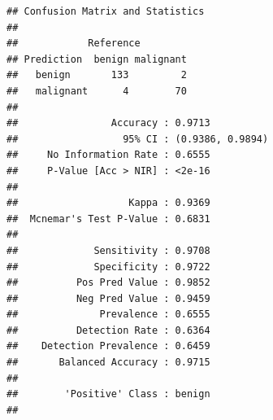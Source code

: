 \documentclass[]{article}
\newenvironment{Shaded}{\begin{snugshade}}{\end{snugshade}}
\newcommand{\KeywordTok}[1]{\textcolor[rgb]{0.13,0.29,0.53}{\textbf{{#1}}}}
\newcommand{\DataTypeTok}[1]{\textcolor[rgb]{0.13,0.29,0.53}{{#1}}}
\newcommand{\FloatTok}[1]{\textcolor[rgb]{0.00,0.00,0.81}{{#1}}}
\newcommand{\StringTok}[1]{\textcolor[rgb]{0.31,0.60,0.02}{{#1}}}
\newcommand{\OtherTok}[1]{\textcolor[rgb]{0.56,0.35,0.01}{{#1}}}
\newcommand{\NormalTok}[1]{{#1}}
\begin{document}
\begin{verbatim}
## Confusion Matrix and Statistics
## 
##            Reference
## Prediction  benign malignant
##   benign       133         2
##   malignant      4        70
##                                           
##                Accuracy : 0.9713          
##                  95% CI : (0.9386, 0.9894)
##     No Information Rate : 0.6555          
##     P-Value [Acc > NIR] : <2e-16          
##                                           
##                   Kappa : 0.9369          
##  Mcnemar's Test P-Value : 0.6831          
##                                           
##             Sensitivity : 0.9708          
##             Specificity : 0.9722          
##          Pos Pred Value : 0.9852          
##          Neg Pred Value : 0.9459          
##              Prevalence : 0.6555          
##          Detection Rate : 0.6364          
##    Detection Prevalence : 0.6459          
##       Balanced Accuracy : 0.9715          
##                                           
##        'Positive' Class : benign          
## 
\end{verbatim}

\begin{Shaded}
\end{Shaded}
\end{document}
